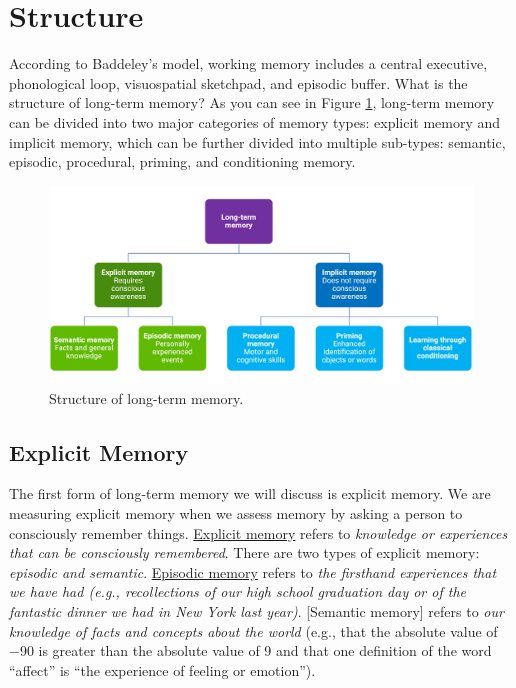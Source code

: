 \documentclass[
]{krantz}
\begin{document}
\section{Structure}\label{structure}

According to Baddeley's model, working memory includes a central executive, phonological loop, visuospatial sketchpad, and episodic buffer. What is the structure of long-term memory? As you can see in Figure \ref{fig:structure}, long-term memory can be divided into two major categories of memory types: explicit memory and implicit memory, which can be further divided into multiple sub-types: semantic, episodic, procedural, priming, and conditioning memory.

\begin{figure}

{\centering \includegraphics[width=0.9\linewidth]{images/ch5/fig2} 

}

\caption{Structure of long-term memory.}\label{fig:structure}
\end{figure}

\subsection*{Explicit Memory}\label{explicit-memory}


The first form of long-term memory we will discuss is explicit memory. We are measuring explicit memory when we assess memory by asking a person to consciously remember things. \hyperref[explicit-memory]{Explicit memory} refers to \emph{knowledge or experiences that can be consciously remembered}. There are two types of explicit memory: \emph{episodic and semantic}. \hyperref[episodic-memory]{Episodic memory} refers to \emph{the firsthand experiences that we have had (e.g., recollections of our high school graduation day or of the fantastic dinner we had in New York last year)}. {[}Semantic memory{]} refers to \emph{our knowledge of facts and concepts about the world} (e.g., that the absolute value of −90 is greater than the absolute value of 9 and that one definition of the word ``affect'' is ``the experience of feeling or emotion'').
\end{document}
